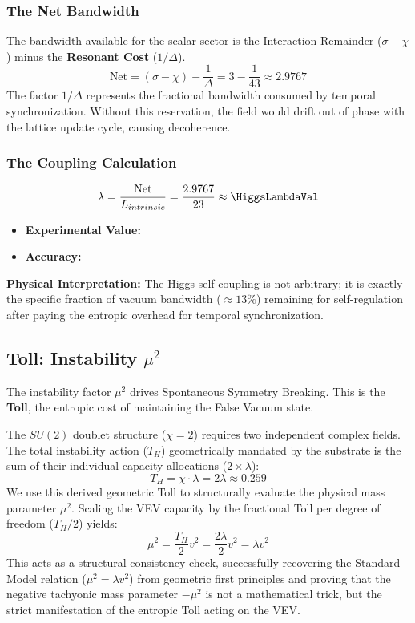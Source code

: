 \subsubsection{The Net Bandwidth}
The bandwidth available for the scalar sector is the Interaction Remainder ($\sigma - \chi$) minus the \textbf{Resonant Cost} ($1/\Delta$).
\begin{equation}
\text{Net} = (\sigma - \chi) - \frac{1}{\Delta} = 3 - \frac{1}{43} \approx 2.9767
\end{equation}
The factor $1/\Delta$ represents the fractional bandwidth consumed by temporal synchronization. Without this reservation, the field would drift out of phase with the lattice update cycle, causing decoherence.

\subsubsection{The Coupling Calculation}
\begin{equation}
\lambda = \frac{\text{Net}}{L_{intrinsic}} = \frac{2.9767}{23} \approx \mathbf{\HiggsLambdaVal}
\end{equation}
\begin{itemize}
    \item \textbf{Experimental Value:} \HiggsLambdaExperimentalValue
    \item \textbf{Accuracy:} \HiggsLambdaAccText
\end{itemize}

\textbf{Physical Interpretation:} The Higgs self-coupling is not arbitrary; it is exactly the specific fraction of vacuum bandwidth ($\approx 13\%$) remaining for self-regulation after paying the entropic overhead for temporal synchronization.

\subsection{Toll: Instability \texorpdfstring{$\mu^2$}{mu2}}
The instability factor $\mu^2$ drives Spontaneous Symmetry Breaking. This is the \textbf{Toll}, the entropic cost of maintaining the False Vacuum state. 

The $SU(2)$ doublet structure ($\chi=2$) requires two independent complex fields. The total instability action ($T_H$) geometrically mandated by the substrate is the sum of their individual capacity allocations ($2 \times \lambda$):
\begin{equation}
T_H = \chi \cdot \lambda = 2\lambda \approx 0.259
\end{equation}
We use this derived geometric Toll to structurally evaluate the physical mass parameter $\mu^2$. Scaling the VEV capacity by the fractional Toll per degree of freedom ($T_H/2$) yields:
\begin{equation}
\mu^2 = \frac{T_H}{2} v^2 = \frac{2\lambda}{2} v^2 = \lambda v^2
\end{equation}
This acts as a structural consistency check, successfully recovering the Standard Model relation ($\mu^2 = \lambda v^2$) from geometric first principles and proving that the negative tachyonic mass parameter $-\mu^2$ is not a mathematical trick, but the strict manifestation of the entropic Toll acting on the VEV.

